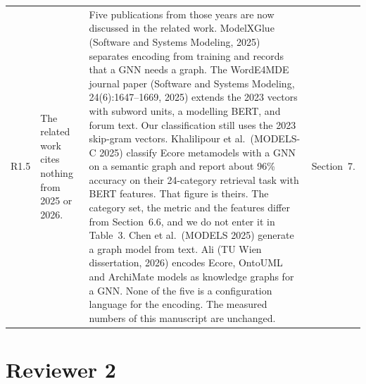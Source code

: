 \documentclass[11pt,a4paper]{article}
\begin{document}
\begin{longtable}{@{}P{1.0cm}P{4.3cm}P{5.9cm}P{3.9cm}@{}}
R1.5 &
The related work cites nothing from 2025 or 2026. &
Five publications from those years are now discussed in the related work. ModelXGlue (Software and Systems Modeling, 2025) separates encoding from training and records that a GNN needs a graph. The WordE4MDE journal paper (Software and Systems Modeling, 24(6):1647--1669, 2025) extends the 2023 vectors with subword units, a modelling BERT, and forum text. Our classification still uses the 2023 skip-gram vectors. Khalilipour et al.\ (MODELS-C 2025) classify Ecore metamodels with a GNN on a semantic graph and report about 96\% accuracy on their 24-category retrieval task with BERT features. That figure is theirs. The category set, the metric and the features differ from Section~6.6, and we do not enter it in Table~3. Chen et al.\ (MODELS 2025) generate a graph model from text. Ali (TU Wien dissertation, 2026) encodes Ecore, OntoUML and ArchiMate models as knowledge graphs for a GNN. None of the five is a configuration language for the encoding. The measured numbers of this manuscript are unchanged. &
Section~7. \\

\end{longtable}

\section*{Reviewer 2}
\end{document}

